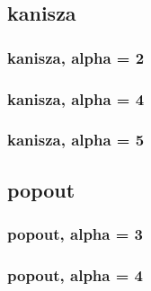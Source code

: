 \documentclass[10pt,a4paper]{article}
\begin{document}
\subsection{kanisza}

\subsubsection{kanisza, alpha = 2}

\subsubsection{kanisza, alpha = 4}

\subsubsection{kanisza, alpha = 5}


\subsection{popout}

\subsubsection{popout, alpha = 3}

\subsubsection{popout, alpha = 4}

\end{document}
